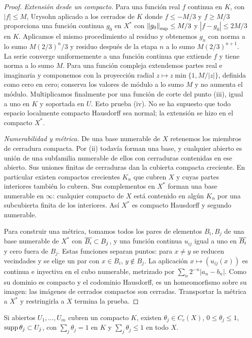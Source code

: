 \begin{proof}
\emph{Extensión desde un compacto.} Para una función real $f$ continua en $K$, con $|f|\le M$, Urysohn aplicado a los cerrados de $K$ donde $f\le-M/3$ y $f\ge M/3$ proporciona una función continua $g_0$ en $X^*$ con $\left\lVert g_0\right\rVert_{\mathrm{sup}}\le M/3$ y $|f-g_0|\le2M/3$ en $K$. Aplicamos el mismo procedimiento al residuo y obtenemos $g_n$ con norma a lo sumo $M(2/3)^n/3$ y residuo después de la etapa $n$ a lo sumo $M(2/3)^{n+1}$. La serie converge uniformemente a una función continua que extiende $f$ y tiene norma a lo sumo $M$. Para una función compleja extendemos partes real e imaginaria y componemos con la proyección radial $z\mapsto z\min\{1,M/|z|\}$, definida como cero en cero; conserva los valores de módulo a lo sumo $M$ y no aumenta el módulo. Multiplicamos finalmente por una función de corte del punto (iii), igual a uno en $K$ y soportada en $U$. Esto prueba (iv). No se ha supuesto que todo espacio localmente compacto Hausdorff sea normal; la extensión se hizo en el compacto $X^*$.

\emph{Numerabilidad y métrica.} De una base numerable de $X$ retenemos los miembros de cerradura compacta. Por (ii) todavía forman una base, y cualquier abierto es unión de una subfamilia numerable de ellos con cerraduras contenidas en ese abierto. Sus uniones finitas de cerraduras dan la cubierta compacta creciente. En particular existen compactos crecientes $K_n$ que cubren $X$ y cuyas partes interiores también lo cubren. Sus complementos en $X^*$ forman una base numerable en $\infty$: cualquier compacto de $X$ está contenido en algún $K_n$ por una subcubierta finita de los interiores. Así $X^*$ es compacto Hausdorff y segundo numerable.

Para construir una métrica, tomamos todos los pares de elementos $B_i,B_j$ de una base numerable de $X^*$ con $\overline{B_i}\subset B_j$, y una función continua $u_{ij}$ igual a uno en $\overline{B_i}$ y cero fuera de $B_j$. Estas funciones separan puntos: para $x\ne y$ se reducen vecindades y se elige un par con $x\in B_i$, $y\notin B_j$. La aplicación $x\mapsto(u_{ij}(x))$ es continua e inyectiva en el cubo numerable, metrizado por $\sum_n2^{-n}|a_n-b_n|$. Como su dominio es compacto y el codominio Hausdorff, es un homeomorfismo sobre su imagen: las imágenes de cerrados compactos son cerradas. Transportar la métrica a $X^*$ y restringirla a $X$ termina la prueba.
\end{proof}
\begin{lema}\label{v2:particion-compacta}
Si abiertos $U_1,\ldots,U_m$ cubren un compacto $K$, existen $\theta_j\in C_c(X)$, $0\le\theta_j\le1$, $\operatorname{supp}\theta_j\subset U_j$, con $\sum_j\theta_j=1$ en $K$ y $\sum_j\theta_j\le1$ en todo $X$.
\end{lema}
